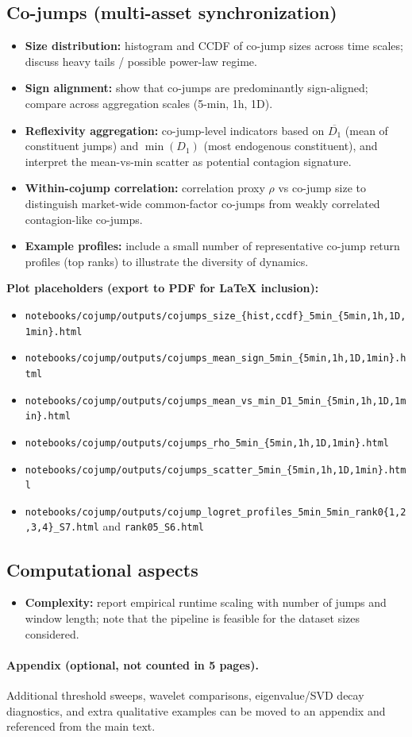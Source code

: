 \documentclass[11pt]{article}
\begin{document}
\subsection*{Co-jumps (multi-asset synchronization)}
\begin{itemize}
    \item \textbf{Size distribution:} histogram and CCDF of co-jump sizes across time scales; discuss heavy tails / possible power-law regime. 
    \item \textbf{Sign alignment:} show that co-jumps are predominantly sign-aligned; compare across aggregation scales (5-min, 1h, 1D). 
    \item \textbf{Reflexivity aggregation:} co-jump-level indicators based on $\overline{D_1}$ (mean of constituent jumps) and $\min(D_1)$ (most endogenous constituent), and interpret the mean-vs-min scatter as potential contagion signature. 
    \item \textbf{Within-cojump correlation:} correlation proxy $\rho$ vs co-jump size to distinguish market-wide common-factor co-jumps from weakly correlated contagion-like co-jumps. 
    \item \textbf{Example profiles:} include a small number of representative co-jump return profiles (top ranks) to illustrate the diversity of dynamics. 
\end{itemize}
\textbf{Plot placeholders (export to PDF for LaTeX inclusion):}
\begin{itemize}
    \item \texttt{notebooks/cojump/outputs/cojumps\_size\_\{hist,ccdf\}\_5min\_\{5min,1h,1D,1min\}.html}
    \item \texttt{notebooks/cojump/outputs/cojumps\_mean\_sign\_5min\_\{5min,1h,1D,1min\}.html}
    \item \texttt{notebooks/cojump/outputs/cojumps\_mean\_vs\_min\_D1\_5min\_\{5min,1h,1D,1min\}.html}
    \item \texttt{notebooks/cojump/outputs/cojumps\_rho\_5min\_\{5min,1h,1D,1min\}.html}
    \item \texttt{notebooks/cojump/outputs/cojumps\_scatter\_5min\_\{5min,1h,1D,1min\}.html}
    \item \texttt{notebooks/cojump/outputs/cojump\_logret\_profiles\_5min\_5min\_rank0\{1,2,3,4\}\_S7.html} and \texttt{rank05\_S6.html}
\end{itemize}

\subsection*{Computational aspects}
\begin{itemize}
    \item \textbf{Complexity:} report empirical runtime scaling with number of jumps and window length; note that the pipeline is feasible for the dataset sizes considered. 
\end{itemize}

\paragraph{Appendix (optional, not counted in 5 pages).}
Additional threshold sweeps, wavelet comparisons, eigenvalue/SVD decay diagnostics, and extra qualitative examples can be moved to an appendix and referenced from the main text.
\end{document}
